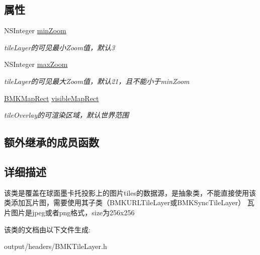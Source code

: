 \subsection*{属性}
\begin{DoxyCompactItemize}
\item 
\hypertarget{interface_b_m_k_tile_layer_a31806dcf1e35a53d50fb40f995ea87d9}{}N\+S\+Integer \hyperlink{interface_b_m_k_tile_layer_a31806dcf1e35a53d50fb40f995ea87d9}{min\+Zoom}\label{interface_b_m_k_tile_layer_a31806dcf1e35a53d50fb40f995ea87d9}

\begin{DoxyCompactList}\small\item\em tile\+Layer的可见最小\+Zoom值，默认3 \end{DoxyCompactList}\item 
\hypertarget{interface_b_m_k_tile_layer_aee6919cb7f36d34eeabf788e17e5ff81}{}N\+S\+Integer \hyperlink{interface_b_m_k_tile_layer_aee6919cb7f36d34eeabf788e17e5ff81}{max\+Zoom}\label{interface_b_m_k_tile_layer_aee6919cb7f36d34eeabf788e17e5ff81}

\begin{DoxyCompactList}\small\item\em tile\+Layer的可见最大\+Zoom值，默认21，且不能小于min\+Zoom \end{DoxyCompactList}\item 
\hypertarget{interface_b_m_k_tile_layer_ae03f9090d6e253640e22d9226714f84c}{}\hyperlink{struct_b_m_k_map_rect}{B\+M\+K\+Map\+Rect} \hyperlink{interface_b_m_k_tile_layer_ae03f9090d6e253640e22d9226714f84c}{visible\+Map\+Rect}\label{interface_b_m_k_tile_layer_ae03f9090d6e253640e22d9226714f84c}

\begin{DoxyCompactList}\small\item\em tile\+Overlay的可渲染区域，默认世界范围 \end{DoxyCompactList}\end{DoxyCompactItemize}
\subsection*{额外继承的成员函数}


\subsection{详细描述}
该类是覆盖在球面墨卡托投影上的图片tiles的数据源，是抽象类，不能直接使用该类添加瓦片图，需要使用其子类（\+B\+M\+K\+U\+R\+L\+Tile\+Layer或\+B\+M\+K\+Sync\+Tile\+Layer） 瓦片图片是jpeg或者png格式，size为256x256 

该类的文档由以下文件生成\+:\begin{DoxyCompactItemize}
\item 
output/headers/B\+M\+K\+Tile\+Layer.\+h\end{DoxyCompactItemize}

